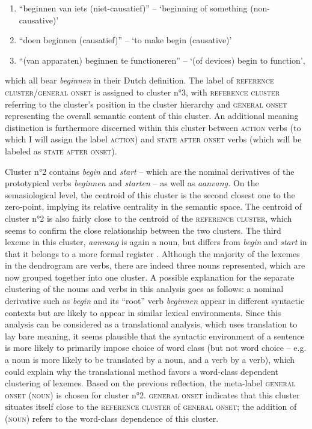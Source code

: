 \begin{enumerate}[label=(\roman*)]
\item “beginnen van iets (niet-causatief)” -- `beginning of something (non-cau\-sa\-tive)'
\item “doen beginnen (causatief)” -- `to make begin (causative)'
\item “(van apparaten) beginnen te functioneren” -- `(of devices) begin to function', 
\end{enumerate}
which all bear \textit{beginnen} in their Dutch definition. The label of \textsc{reference cluster}\slash \textsc{general onset} is assigned to cluster n°3, with \textsc{reference cluster} referring to the cluster’s position in the cluster hierarchy and \textsc{general onset} representing the overall semantic content of this cluster. An additional meaning distinction is furthermore discerned within this cluster between \textsc{action} verbs (to which I will assign the label \textsc{action}) and \textsc{state after onset} verbs (which will be labeled as \textsc{state after onset}).

Cluster n°2 contains \textit{begin} and \textit{start} – which are the nominal derivatives of the prototypical verbs \textit{beginnen} and \textit{starten} -- as well as \textit{aanvang.} On the semasiological level, the centroid of this cluster is the second closest one to the zero-point, implying its relative centrality in the semantic space. The centroid of cluster n°2 is also fairly close to the centroid of the \textsc{reference cluster}, which seems to confirm the close relationship between the two clusters. The third lexeme in this cluster, \textit{aanvang} is again a noun, but differs from \textit{begin} and \textit{start} in that it belongs to a more formal register \citep{van_dale_van_2015}. Although the majority of the lexemes in the dendrogram are verbs, there are indeed three nouns represented, which are now grouped together into one cluster. A possible explanation for the separate clustering of the nouns and verbs in this analysis goes as follows: a nominal derivative such as \textit{begin} and its ``root'' verb \textit{beginnen} appear in different syntactic contexts but are likely to appear in similar lexical environments. Since this analysis can be considered as a translational analysis, which uses translation to lay bare meaning, it seems plausible that the syntactic environment of a sentence is more likely to primarily impose choice of word class (but not word choice -- e.g. a noun is more likely to be translated by a noun, and a verb by a verb), which could explain why the translational method favors a word-class dependent clustering of lexemes. Based on the previous reflection, the meta-label \textsc{general onset} (\textsc{noun}) is chosen for cluster n°2. \textsc{general onset} indicates that this cluster situates itself close to the \textsc{reference cluster} of \textsc{general onset}; the addition of (\textsc{noun}) refers to the word-class dependence of this cluster.

